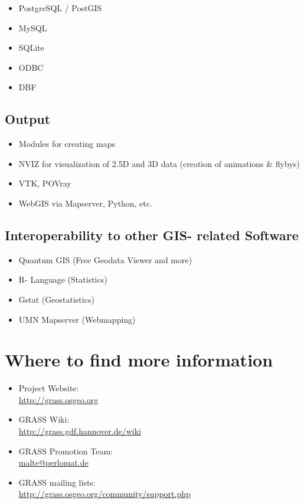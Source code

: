 \documentclass[notumble,a4paper,10pt,nofoldmark]{leaflet}
\newcommand{\GRASSurl}{\url{http://grass.osgeo.org}}
\begin{document}
\begin{itemize}
\item PostgreSQL / PostGIS
\item MySQL
\item SQLite
\item ODBC
\item DBF
\end{itemize}

\subsection{Output}

\begin{itemize}
\item Modules for creating maps
\item NVIZ for visualization of 2.5D and 3D data (creation of animations \& flybys)
\item VTK, POVray
\item WebGIS via Mapserver, Python, etc.
\end{itemize}

\subsection{Interoperability to other GIS- related Software}

\begin{itemize}
\item Quantum GIS (Free Geodata Viewer and more)
\item R- Language (Statistics)
\item Gstat (Geostatistics)
\item UMN Mapserver (Webmapping)
\end{itemize}

\section{Where to find more information}

\begin{itemize}
\item{Project Website: \\\GRASSurl}
\item{GRASS Wiki: \\\url{http://grass.gdf.hannover.de/wiki}}
\item{GRASS Promotion Team: \\\url{malte@perlomat.de}}
\item{GRASS mailing lists: \\\url{http://grass.osgeo.org/community/support.php}}
\end{itemize}
\end{document}

